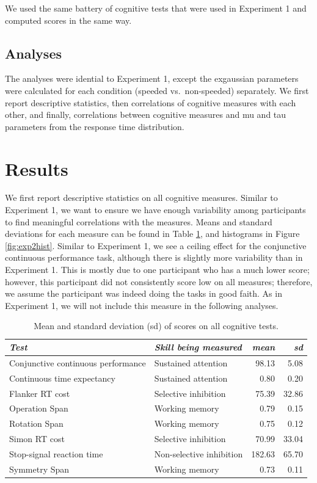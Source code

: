 \documentclass[
  man,floatsintext]{apa6}
\begin{document}
We used the same battery of cognitive tests that were used in Experiment 1 and computed scores in the same way.

\hypertarget{analyses-1}{%
\subsection{Analyses}\label{analyses-1}}

The analyses were idential to Experiment 1, except the exgaussian parameters were calculated for each condition (speeded vs.~non-speeded) separately. We first report descriptive statistics, then correlations of cognitive measures with each other, and finally, correlations between cognitive measures and mu and tau parameters from the response time distribution.

\hypertarget{results-1}{%
\section{Results}\label{results-1}}

We first report descriptive statistics on all cognitive measures. Similar to Experiment 1, we want to ensure we have enough variability among participants to find meaningful correlations with the measures. Means and standard deviations for each measure can be found in Table \ref{tab:cogskillsdesstatsE2}, and histograms in Figure \ref{fig:exp2hist}. Similar to Experiment 1, we see a ceiling effect for the conjunctive continuous performance task, although there is slightly more variability than in Experiment 1. This is mostly due to one participant who has a much lower score; however, this participant did not consistently score low on all measures; therefore, we assume the participant was indeed doing the tasks in good faith. As in Experiment 1, we will not include this measure in the following analyses.

\begin{table}

\caption{\label{tab:cogskillsdesstatsE2}Mean and standard deviation (sd) of scores on all cognitive tests.}
\centering
\begin{tabular}[t]{llrr}
\toprule
\em{Test} & \em{Skill being measured} & \em{mean} & \em{sd}\\
\midrule
Conjunctive continuous
 performance & Sustained attention & 98.13 & 5.08\\
Continuous time
 expectancy & Sustained attention & 0.80 & 0.20\\
Flanker RT cost & Selective inhibition & 75.39 & 32.86\\
Operation Span & Working memory & 0.79 & 0.15\\
Rotation Span & Working memory & 0.75 & 0.12\\
\addlinespace
Simon RT cost & Selective inhibition & 70.99 & 33.04\\
Stop-signal reaction time & Non-selective inhibition & 182.63 & 65.70\\
Symmetry Span & Working memory & 0.73 & 0.11\\
\bottomrule
\end{tabular}
\end{table}
\end{document}

